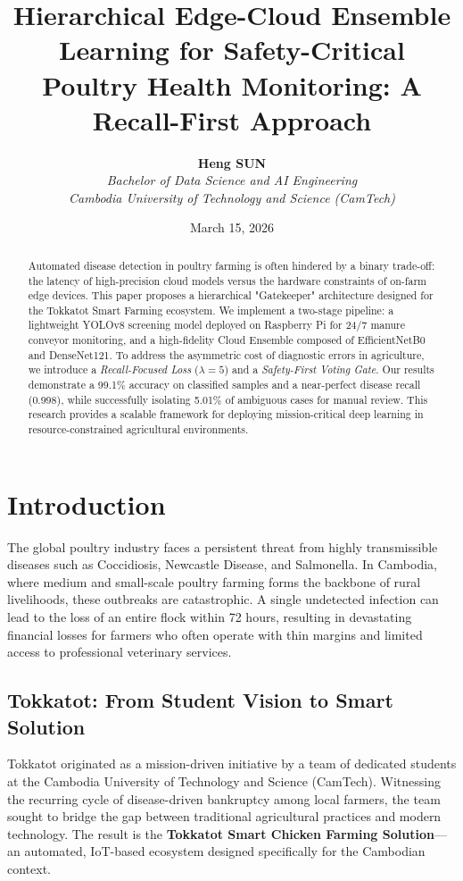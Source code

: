\documentclass[12pt,a4paper]{article}
\title{\Large \textbf{Hierarchical Edge-Cloud Ensemble Learning for Safety-Critical Poultry Health Monitoring: A Recall-First Approach}}
\author{\textbf{Heng SUN} \\ 
        \textit{Bachelor of Data Science and AI Engineering} \\
        \textit{Cambodia University of Technology and Science (CamTech)}}
\date{March 15, 2026}
\begin{document}
\maketitle

\begin{abstract}
Automated disease detection in poultry farming is often hindered by a binary trade-off: the latency of high-precision cloud models versus the hardware constraints of on-farm edge devices. This paper proposes a hierarchical "Gatekeeper" architecture designed for the Tokkatot Smart Farming ecosystem. We implement a two-stage pipeline: a lightweight YOLOv8 screening model deployed on Raspberry Pi for 24/7 manure conveyor monitoring, and a high-fidelity Cloud Ensemble composed of EfficientNetB0 and DenseNet121. To address the asymmetric cost of diagnostic errors in agriculture, we introduce a \textit{Recall-Focused Loss} ($\lambda=5$) and a \textit{Safety-First Voting Gate}. Our results demonstrate a 99.1\% accuracy on classified samples and a near-perfect disease recall (0.998), while successfully isolating 5.01\% of ambiguous cases for manual review. This research provides a scalable framework for deploying mission-critical deep learning in resource-constrained agricultural environments.
\end{abstract}

\newpage

\section{Introduction}
The global poultry industry faces a persistent threat from highly transmissible diseases such as Coccidiosis, Newcastle Disease, and Salmonella. In Cambodia, where medium and small-scale poultry farming forms the backbone of rural livelihoods, these outbreaks are catastrophic. A single undetected infection can lead to the loss of an entire flock within 72 hours, resulting in devastating financial losses for farmers who often operate with thin margins and limited access to professional veterinary services.

\subsection{Tokkatot: From Student Vision to Smart Solution}
Tokkatot originated as a mission-driven initiative by a team of dedicated students at the Cambodia University of Technology and Science (CamTech). Witnessing the recurring cycle of disease-driven bankruptcy among local farmers, the team sought to bridge the gap between traditional agricultural practices and modern technology. The result is the \textbf{Tokkatot Smart Chicken Farming Solution}---an automated, IoT-based ecosystem designed specifically for the Cambodian context.
\end{document}

